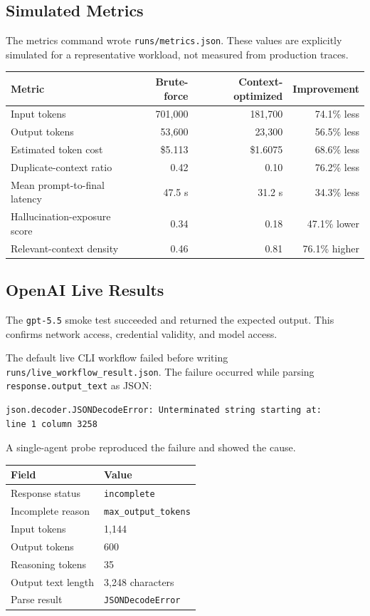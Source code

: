 \documentclass[11pt]{article}
\begin{document}
\subsection{Simulated Metrics}

The metrics command wrote \texttt{runs/metrics.json}. These values are explicitly simulated for a representative workload, not measured from production traces.

\begin{longtable}{lrrr}
\toprule
Metric & Brute-force & Context-optimized & Improvement \\
\midrule
Input tokens & 701,000 & 181,700 & 74.1\% less \\
Output tokens & 53,600 & 23,300 & 56.5\% less \\
Estimated token cost & \$5.113 & \$1.6075 & 68.6\% less \\
Duplicate-context ratio & 0.42 & 0.10 & 76.2\% less \\
Mean prompt-to-final latency & 47.5 s & 31.2 s & 34.3\% less \\
Hallucination-exposure score & 0.34 & 0.18 & 47.1\% lower \\
Relevant-context density & 0.46 & 0.81 & 76.1\% higher \\
\bottomrule
\end{longtable}

\subsection{OpenAI Live Results}

The \texttt{gpt-5.5} smoke test succeeded and returned the expected output. This confirms network access, credential validity, and model access.

The default live CLI workflow failed before writing \texttt{runs/live\_workflow\_result.json}. The failure occurred while parsing \texttt{response.output\_text} as JSON:

\begin{verbatim}
json.decoder.JSONDecodeError: Unterminated string starting at:
line 1 column 3258
\end{verbatim}

A single-agent probe reproduced the failure and showed the cause.

\begin{longtable}{ll}
\toprule
Field & Value \\
\midrule
Response status & \texttt{incomplete} \\
Incomplete reason & \texttt{max\_output\_tokens} \\
Input tokens & 1,144 \\
Output tokens & 600 \\
Reasoning tokens & 35 \\
Output text length & 3,248 characters \\
Parse result & \texttt{JSONDecodeError} \\
\bottomrule
\end{longtable}
\end{document}
